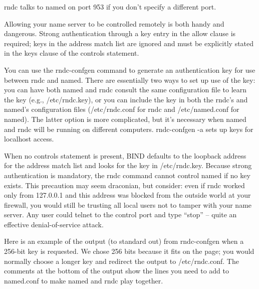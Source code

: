 
{rndc }talks to {named }on port 953 if you don't specify a different
port.

Allowing your name server to be controlled remotely is both handy and
dangerous. Strong authentication through a {key} entry in the {allow}
clause is required; keys in the address match list are ignored and must
be explicitly stated in the {keys} clause of the {controls} statement.

You can use the
\protect\hypertarget{part0024_split_045.htmlux5cux23_idIndexMarker2201}{}{}\protect\hypertarget{part0024_split_045.htmlux5cux23_idIndexMarker2202}{}{}{rndc-confgen}
command to generate an authentication key for use between {rndc} and
{named}. There are essentially two ways to set up use of the key: you
can have both {named} and {rndc} consult the same configuration file to
learn the key (e.g.,
\protect\hypertarget{part0024_split_045.htmlux5cux23_idIndexMarker2203}{}{}\protect\hypertarget{part0024_split_045.htmlux5cux23_idIndexMarker2204}{}{}{/etc/rndc.key}),
or you can include the key in both the {rndc}'s and {named}'s
configuration files
\protect\hypertarget{part0024_split_045.htmlux5cux23_idIndexMarker2205}{}{}\protect\hypertarget{part0024_split_045.htmlux5cux23_idIndexMarker2206}{}{}({/etc/rndc.conf}
for {rndc} and {/etc/named.conf} for {named}). The latter option is more
complicated, but it's necessary when {named} and {rndc} will be running
on different computers. {rndc-confgen -a} sets up keys for localhost
access.

When no {controls} statement is present, BIND defaults to the loopback
address for the address match list and looks for the key in
{/etc/rndc.key}. Because strong authentication is mandatory, the {rndc}
command cannot control {named} if no key exists. This precaution may
seem draconian, but consider: even if {rndc} worked only from 127.0.0.1
and this address was blocked from the outside world at your firewall,
you would still be trusting all local users not to tamper with your name
server. Any user could {telnet} to the control port and type
``stop'' -- quite an effective denial-of-service attack.

Here is an example of the output (to standard out) from {rndc-confgen}
when a 256-bit key is requested. We chose 256 bits because it fits on
the page; you would normally choose a longer key and redirect the output
to {/etc/rndc.conf}. The comments at the bottom of the output show the
lines you need to add to {named.conf} to make {named} and {rndc} play
together.

